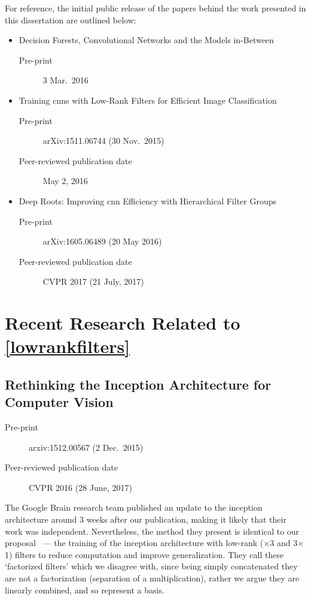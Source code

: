 \documentclass[thesis]{subfiles}
\begin{document}
For reference, the initial public release of the papers behind the work presented in this dissertation are outlined below:
\begin{itemize}
    \item Decision Forests, Convolutional Networks and the Models in-Between~\citep{Ioannou2015}
    \begin{description}
        \item[Pre-print] 3 Mar.\ 2016
    \end{description}
    \item Training \glspl{cnn} with Low-Rank Filters for Efficient Image Classification~\citep{Ioannou2016}
    \begin{description}
        \item[Pre-print] arXiv:1511.06744 (30 Nov.\ 2015)
        \item[Peer-reviewed publication date] May 2, 2016
    \end{description}
    \item Deep Roots: Improving \gls{cnn} Efficiency with Hierarchical Filter Groups~\citep{ioannou2016e}
    \begin{description}
        \item[Pre-print] arXiv:1605.06489 (20 May 2016)
        \item[Peer-reviewed publication date] CVPR 2017 (21 July, 2017)
    \end{description}
\end{itemize}

\section{Recent Research Related to \cref{lowrankfilters}}
\subsection*{Rethinking the Inception Architecture for Computer Vision}
\begin{description}
    \item[Pre-print] arxiv:1512.00567 (2 Dec.\ 2015)
    \item[Peer-reviewed publication date] CVPR 2016 (28 June, 2017)
\end{description}
The Google Brain research team published an update to the \Gls{inception} architecture around 3 weeks after our publication, making it likely that their work was independent. Nevertheless, the method they present is identical to our proposal~\citep{Ioannou2016} --- the training of the \Gls{inception} architecture with low-rank ($\times$3 and 3$\times$1) filters to reduce computation and improve generalization. They call these `factorized filters' which we disagree with, since being simply concatenated they are not a factorization (\ie separation of a multiplication), rather we argue they are linearly combined, and so represent a basis.
\end{document}
